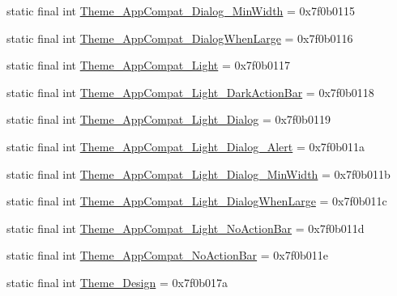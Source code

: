 \begin{CompactItemize}
\item 
static final int \hyperlink{classandroid_1_1support_1_1graphics_1_1drawable_1_1animated_1_1_r_1_1style_e7f296b00999960aa689db08f039248a}{Theme\_\-AppCompat\_\-Dialog\_\-MinWidth} = 0x7f0b0115
\item 
static final int \hyperlink{classandroid_1_1support_1_1graphics_1_1drawable_1_1animated_1_1_r_1_1style_9aacc4944f0c9e5cb38ad4dff542a6a0}{Theme\_\-AppCompat\_\-DialogWhenLarge} = 0x7f0b0116
\item 
static final int \hyperlink{classandroid_1_1support_1_1graphics_1_1drawable_1_1animated_1_1_r_1_1style_788a5fa713abdd99bf99c9e292f2893e}{Theme\_\-AppCompat\_\-Light} = 0x7f0b0117
\item 
static final int \hyperlink{classandroid_1_1support_1_1graphics_1_1drawable_1_1animated_1_1_r_1_1style_74b2b8dc7539d6662d4fc4d1523dc43c}{Theme\_\-AppCompat\_\-Light\_\-DarkActionBar} = 0x7f0b0118
\item 
static final int \hyperlink{classandroid_1_1support_1_1graphics_1_1drawable_1_1animated_1_1_r_1_1style_3fefee4fb86be03dc9f8c86f0f9856af}{Theme\_\-AppCompat\_\-Light\_\-Dialog} = 0x7f0b0119
\item 
static final int \hyperlink{classandroid_1_1support_1_1graphics_1_1drawable_1_1animated_1_1_r_1_1style_7d2712ec30c9436d875ffe8b5ec0ce7a}{Theme\_\-AppCompat\_\-Light\_\-Dialog\_\-Alert} = 0x7f0b011a
\item 
static final int \hyperlink{classandroid_1_1support_1_1graphics_1_1drawable_1_1animated_1_1_r_1_1style_bdb664c352c6b77c52949c4fef184663}{Theme\_\-AppCompat\_\-Light\_\-Dialog\_\-MinWidth} = 0x7f0b011b
\item 
static final int \hyperlink{classandroid_1_1support_1_1graphics_1_1drawable_1_1animated_1_1_r_1_1style_f8c1891a0dcb070d026088908aebf423}{Theme\_\-AppCompat\_\-Light\_\-DialogWhenLarge} = 0x7f0b011c
\item 
static final int \hyperlink{classandroid_1_1support_1_1graphics_1_1drawable_1_1animated_1_1_r_1_1style_957064a54b284a7b6f57f46a79186ea6}{Theme\_\-AppCompat\_\-Light\_\-NoActionBar} = 0x7f0b011d
\item 
static final int \hyperlink{classandroid_1_1support_1_1graphics_1_1drawable_1_1animated_1_1_r_1_1style_3f814e447eb83466a80457b716811b93}{Theme\_\-AppCompat\_\-NoActionBar} = 0x7f0b011e
\item 
static final int \hyperlink{classandroid_1_1support_1_1graphics_1_1drawable_1_1animated_1_1_r_1_1style_dabc564e8fe3cb950906b8b93bd46488}{Theme\_\-Design} = 0x7f0b017a

\end{CompactItemize}
